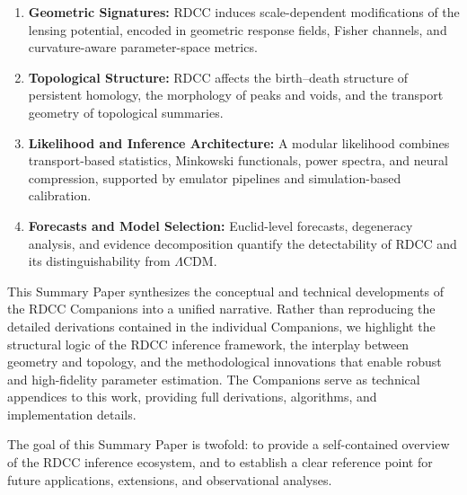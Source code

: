 \documentclass[11pt,a4paper]{article}
\begin{document}
\begin{enumerate}
    \item \textbf{Geometric Signatures:} RDCC induces scale-dependent 
    modifications of the lensing potential, encoded in geometric response 
    fields, Fisher channels, and curvature-aware parameter-space metrics.

    \item \textbf{Topological Structure:} RDCC affects the birth--death 
    structure of persistent homology, the morphology of peaks and voids, and the 
    transport geometry of topological summaries.

    \item \textbf{Likelihood and Inference Architecture:} A modular likelihood 
    combines transport-based statistics, Minkowski functionals, power spectra, 
    and neural compression, supported by emulator pipelines and 
    simulation-based calibration.

    \item \textbf{Forecasts and Model Selection:} Euclid-level forecasts, 
    degeneracy analysis, and evidence decomposition quantify the detectability 
    of RDCC and its distinguishability from $\Lambda$CDM.
\end{enumerate}

This Summary Paper synthesizes the conceptual and technical developments of the 
RDCC Companions into a unified narrative. Rather than reproducing the detailed 
derivations contained in the individual Companions, we highlight the structural 
logic of the RDCC inference framework, the interplay between geometry and 
topology, and the methodological innovations that enable robust and 
high-fidelity parameter estimation. The Companions serve as technical appendices 
to this work, providing full derivations, algorithms, and implementation 
details.

The goal of this Summary Paper is twofold: to provide a self-contained overview 
of the RDCC inference ecosystem, and to establish a clear reference point for 
future applications, extensions, and observational analyses.
\end{document}
